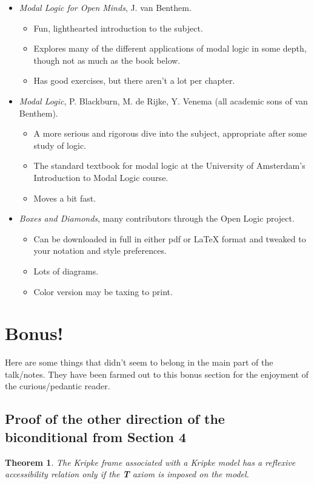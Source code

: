 \documentclass[12pt]{article}
\newtheorem{theorem}{Theorem}[section]
\begin{document}
\begin{itemize}[noitemsep]
    \item \emph{Modal Logic for Open Minds}, J. van Benthem.
    \begin{itemize}[noitemsep]
        \item Fun, lighthearted introduction to the subject.
        \item Explores many of the different applications of modal logic in some depth, though not as much as the book below.
        \item Has good exercises, but there aren't a lot per chapter.
    \end{itemize}
    \item \emph{Modal Logic}, P. Blackburn, M. de Rijke, Y. Venema (all academic sons of van Benthem).
    \begin{itemize}[noitemsep]
        \item A more serious and rigorous dive into the subject, appropriate after some study of logic.
        \item The standard textbook for modal logic at the University of Amsterdam's Introduction to Modal Logic course.
        \item Moves a bit fast.
    \end{itemize}
    \item \emph{Boxes and Diamonds}, many contributors through the Open Logic project.
    \begin{itemize}[noitemsep]
        \item Can be downloaded in full in either pdf or \LaTeX \: format and tweaked to your notation and style preferences.
        \item Lots of diagrams.
        \item Color version may be taxing to print.
    \end{itemize}
\end{itemize}

\section{Bonus!}
Here are some things that didn't seem to belong in the main part of the talk/notes. They have been farmed out to this bonus section for the 
enjoyment of the curious/pedantic reader.

\subsection{Proof of the other direction of the biconditional from Section 4}
\begin{theorem}
    The Kripke frame associated with a Kripke model has a reflexive accessibility relation only if the \textbf{T} axiom is imposed on the model.
\end{theorem}
\end{document}

